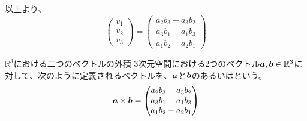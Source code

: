 \documentclass[../../../topic_linear-algebra]{subfiles}
\begin{document}
以上より、
\begin{equation*}
  \begin{pmatrix}
    v_1 \\
    v_2 \\
    v_3
  \end{pmatrix} = \begin{pmatrix}
    a_2b_3 - a_3b_2 \\
    a_3b_1 - a_1b_3 \\
    a_1b_2 - a_2b_1
  \end{pmatrix}
\end{equation*}

\begin{definition*}{$\mathbb{R}^3$における二つのベクトルの外積}
  3次元空間における2つのベクトル$\vb*{a}, \vb*{b} \in \mathbb{R}^3$に対して、次のように定義されるベクトルを、$\vb*{a}$と$\vb*{b}$のあるいはという。
  \begin{equation*}
    \vb*{a} \times \vb*{b} = \begin{pmatrix}
      a_2b_3 - a_3b_2 \\
      a_3b_1 - a_1b_3 \\
      a_1b_2 - a_2b_1
    \end{pmatrix}
  \end{equation*}
\end{definition*}
\end{document}
